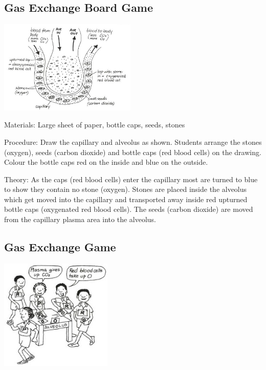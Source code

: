 \begin{multicols}{2}
\subsection{Gas Exchange Board Game}

\begin{center}
\includegraphics[width=0.49\textwidth]{./img/vso/gas-exchange-game.jpg}
\end{center}

\begin{description*}
\item[Materials:]{Large sheet of paper, bottle caps, seeds, stones}
\item[Procedure:]{Draw the capillary and alveolus as
shown. Students arrange the
stones (oxygen), seeds (carbon
dioxide) and bottle caps (red
blood cells) on the drawing. Colour the bottle caps red on the inside and blue on the outside.}
\item[Theory:]{As the caps (red blood cells) enter the capillary most are turned to blue to show they contain no stone (oxygen). Stones are placed inside the alveolus which get moved into the capillary and transported away inside red upturned bottle caps (oxygenated red blood cells). The seeds (carbon dioxide) are moved from the capillary plasma area into the alveolus.}
\end{description*}

\subsection{Gas Exchange Game} %

\begin{center}
\includegraphics[width=0.4\textwidth]{./img/vso/gas-exchange-students.jpg}
\end{center}


\end{multicols}
